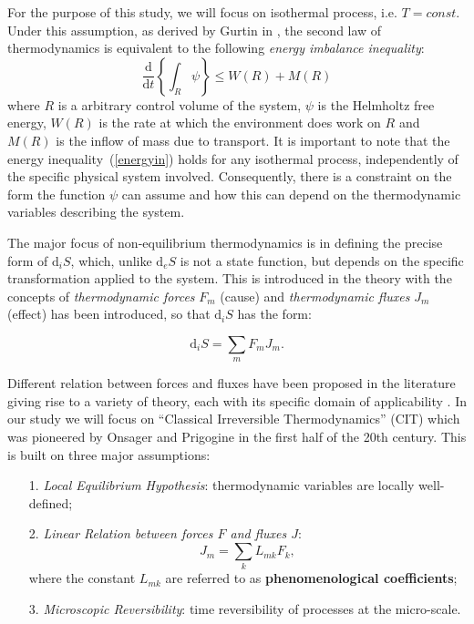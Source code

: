 \documentclass[12pt]{extarticle}
\renewcommand{\d}{\ensuremath{\text{d}}}
\begin{document}
For the purpose of this study, we will focus on isothermal process, i.e. $T=const$. Under this assumption, as derived by Gurtin in \cite{GURTIN}, the second law of thermodynamics is equivalent to the following \textit{energy imbalance inequality}:
\begin{equation}
\frac{\d}{\d t} \left\{\int_R \psi \right\}\leq W(R) + M(R) \label{energyin}
\end{equation}
where $R$ is a arbitrary control volume of the system, $\psi$ is the Helmholtz free energy, $W(R)$ is the rate at which the environment does work on $R$ and $M(R)$ is the inflow of mass due to transport. It is important to note that the energy inequality~(\ref{energyin}) holds for any isothermal process, independently of the specific physical system involved. Consequently, there is a constraint on the form the function $\psi$ can assume and how this can depend on the thermodynamic variables describing the system. 

The major focus of non-equilibrium thermodynamics is in defining the precise form of $\d_i S$, which, unlike $\d_e S$ is not a state function, but depends on the specific transformation applied to the system. This is introduced in the theory with the concepts of \textit{thermodynamic forces} $F_m$ (cause) and \textit{thermodynamic fluxes} $J_m$ (effect) has been introduced, so that $\d_iS$ has the form:

\begin{equation}
\d_iS = \sum_m F_m J_m.
\label{2law}
\end{equation}

Different relation between forces and fluxes have been proposed in the literature giving rise to a variety of theory, each with its specific domain of applicability \cite{NET}. In our study we will focus on \textquotedblleft Classical Irreversible Thermodynamics'' (CIT) which was pioneered by Onsager \cite{onsager} and Prigogine \cite{prigogine} in the first half of the 20th century. This is built on three major assumptions:
\begin{itemize}
	\item[1.] \textit{Local Equilibrium Hypothesis}: thermodynamic variables are locally well-defined;
	\item[2.] \textit{Linear Relation between forces $F$ and fluxes $J$}:
	\begin{equation}
		 J_m = \sum_k L_{mk} F_k,\label{lin}
	\end{equation}
	where the constant $L_{mk}$ are referred to as \textbf{phenomenological coefficients};
	\item[3.] \textit{Microscopic Reversibility}: time reversibility of processes at the micro-scale. 
\end{itemize}
\end{document}
